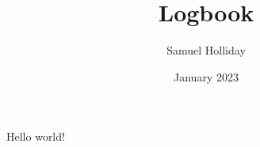 \documentclass{memoir}
\title{Logbook}
\author{Samuel Holliday}
\date{January 2023}
\begin{document}
   \maketitle
   Hello world!
\end{document}
